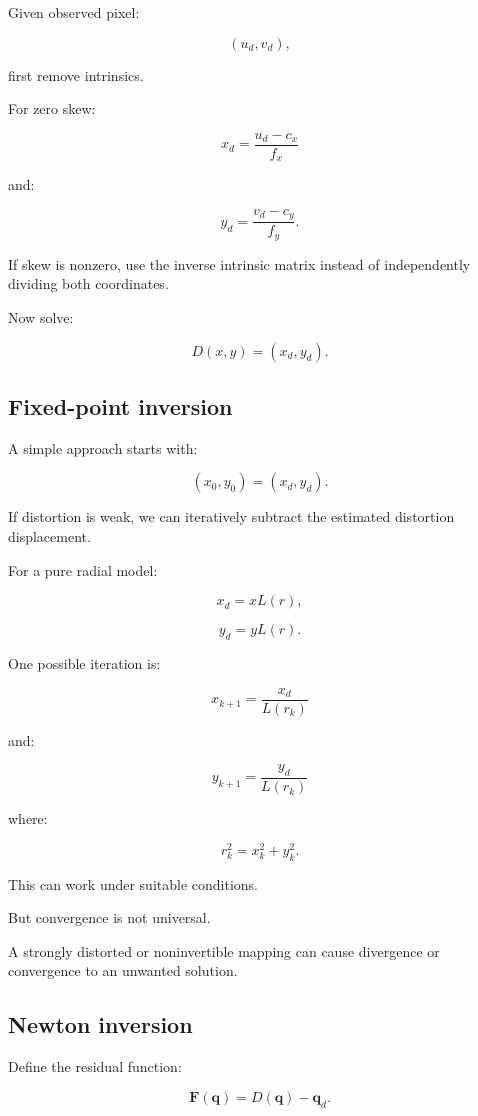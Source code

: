 Given observed pixel:

\[
 (u_d,v_d),
\]

first remove intrinsics.

For zero skew:

\[
 \boxed{ x_d=\frac{u_d-c_x}{f_x} }
\]

and:

\[
 \boxed{ y_d=\frac{v_d-c_y}{f_y} }.
\]

If skew is nonzero, use the inverse intrinsic matrix instead of independently dividing both coordinates.

Now solve:

\[
 D(x,y)=(x_d,y_d).
\]

\subsection{Fixed-point inversion}\label{02-foundations-ii-ch035-fixed-point-inversion}

A simple approach starts with:

\[
 \boxed{ (x_0,y_0)=(x_d,y_d) }.
\]

If distortion is weak, we can iteratively subtract the estimated distortion displacement.

For a pure radial model:

\[
 x_d=xL(r),
\]

\[
 y_d=yL(r).
\]

One possible iteration is:

\[
 \boxed{ x_{k+1}=\frac{x_d}{L(r_k)} }
\]

and:

\[
 \boxed{ y_{k+1}=\frac{y_d}{L(r_k)} }
\]

where:

\[
 r_k^2=x_k^2+y_k^2.
\]

This can work under suitable conditions.

But convergence is not universal.

A strongly distorted or noninvertible mapping can cause divergence or convergence to an unwanted solution.

\subsection{Newton inversion}\label{02-foundations-ii-ch035-newton-inversion}

Define the residual function:

\[
 \boxed{ \mathbf F(\mathbf q)= D(\mathbf q)-\mathbf q_d }.
\]


